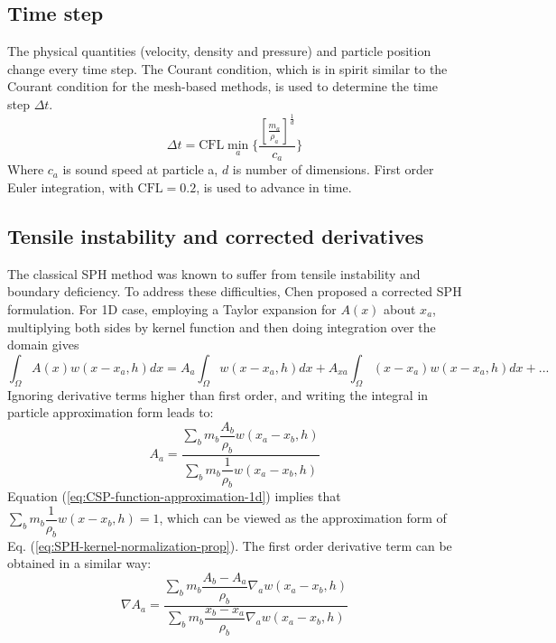 \documentclass[journal abbreviation, manuscript]{copernicus}
\begin{document}
\subsection{Time step}
The physical quantities (velocity, density and pressure) and particle position change every time step. The Courant condition, which is in spirit similar to the Courant condition for the mesh-based methods, is used to determine the time step $\Delta t$.
\begin{equation}
\Delta t = \textrm{CFL} \min_a \bigg \lbrace \dfrac{\left[\frac{m_a}{\rho_a}\right]^{\frac{1}{d}}}{c_a} \bigg \rbrace
\end{equation}
Where $c_a$ is sound speed at particle a, $d$ is number of dimensions. First order Euler integration, with $\textrm{CFL} = 0.2$, is used to advance in time.

\subsection{Tensile instability and corrected derivatives}
The classical SPH method was known to suffer from tensile instability and boundary deficiency. To address these difficulties, Chen \citep{chen1999improvement} proposed a corrected SPH formulation. For 1D case, employing a Taylor expansion for $A\left(x\right)$ about $x_a$, multiplying both sides by kernel function and then doing integration over the domain gives
\begin{equation}
\int_{\Omega} A\left(x\right) w\left(x- x_a, h\right) dx = 
A_a \int_{\Omega} w\left(x - x_a, h\right) dx +A_{xa} \int_{\Omega} \left(x-x_a\right) w\left(x - x_a, h\right) dx +...
\end{equation}
Ignoring derivative terms higher than first order, and writing the integral in particle approximation form leads to:
\begin{equation}
A_a = \frac{\sum_b m_b \dfrac{A_b}{\rho_b} w\left(x_a-x_b, h\right)}{\sum_b m_b \dfrac{1}{\rho_b} w\left(x_a-x_b, h\right)}
\label{eq:CSP-function-approximation-1d}
\end{equation}
Equation (\ref{eq:CSP-function-approximation-1d}) implies that $\sum_b m_b \dfrac{1}{\rho_b} w\left(x-x_b, h\right) = 1$, which can be viewed as the approximation form of Eq. (\ref{eq:SPH-kernel-normalization-prop}). The first order derivative term can be obtained in a similar way:
\begin{equation}
\nabla A_a = \frac{\sum_b m_b \dfrac{A_b - A_a}{\rho_b} \nabla_a w\left(x_a-x_b, h\right)}{\sum_b m_b \dfrac{x_b - x_a}{\rho_b} \nabla_a w\left(x_a-x_b, h\right)}
\end{equation}
\end{document}
